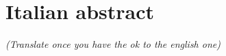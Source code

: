 \chapter*{Italian abstract}

\begin{center}
\textit{(Translate once you have the ok to the english one)}
\end{center}